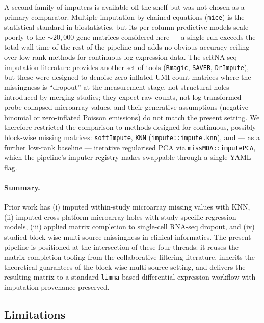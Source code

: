 \documentclass[11pt,a4paper]{article}
\begin{document}
A second family of imputers is available off-the-shelf but was
not chosen as a primary comparator. Multiple imputation by
chained equations (\texttt{mice}) is the statistical standard
in biostatistics, but its per-column predictive models scale
poorly to the $\sim\!20{,}000$-gene matrices considered here ---
a single run exceeds the total wall time of the rest of the
pipeline and adds no obvious accuracy ceiling over low-rank
methods for continuous log-expression data. The scRNA-seq
imputation literature provides another set of tools
(\texttt{Rmagic}, \texttt{SAVER}, \texttt{DrImpute}), but these
were designed to denoise zero-inflated UMI count matrices where
the missingness is ``dropout'' at the measurement stage, not
structural holes introduced by merging studies; they expect raw
counts, not log-transformed probe-collapsed microarray values,
and their generative assumptions (negative-binomial or
zero-inflated Poisson emissions) do not match the present
setting. We therefore restricted the comparison to methods
designed for continuous, possibly block-wise missing matrices:
\texttt{softImpute}, \texttt{KNN} (\texttt{impute::impute.knn}),
and --- as a further low-rank baseline --- iterative regularised
PCA via \texttt{missMDA::imputePCA}, which the pipeline's
imputer registry makes swappable through a single YAML flag.

\paragraph{Summary.}
Prior work has (i) imputed within-study microarray missing
values with KNN, (ii) imputed cross-platform microarray holes
with study-specific regression models, (iii) applied
matrix completion to single-cell RNA-seq dropout, and (iv)
studied block-wise multi-source missingness in clinical
informatics. The present pipeline is positioned at the
intersection of these four threads: it reuses the
matrix-completion tooling from the collaborative-filtering
literature, inherits the theoretical guarantees of the
block-wise multi-source setting, and delivers the resulting
matrix to a standard \texttt{limma}-based differential expression
workflow with imputation provenance preserved.

\subsection{Limitations}
\end{document}
